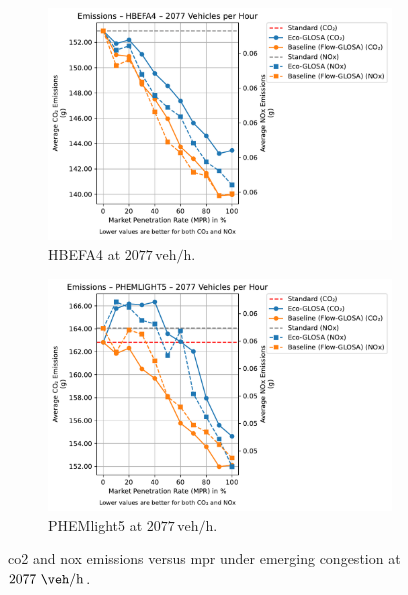 \begin{figure}[htbp]
  \centering
  \begin{subfigure}[b]{0.98\textwidth}
    \includegraphics[width=\textwidth]{data/img/Emissions/Emissions_HBEFA4_Cars2077.pdf}
    \caption{HBEFA4 at $2077\,\mathrm{veh/h}$.}
    \label{fig:Emis_2077_HBEFA4}
  \end{subfigure}
  \begin{subfigure}[b]{0.98\textwidth}
    \includegraphics[width=\textwidth]{data/img/Emissions/Emissions_PHEMLIGHT5_Cars2077.pdf}
    \caption{PHEMlight5 at $2077\,\mathrm{veh/h}$.}
    \label{fig:Emis_2077_PHEM}
  \end{subfigure}
  \caption[\ac{co2} and \ac{nox} emissions vs. \ac{mpr} at $2077~\unit{\veh\per\hour}$]{\ac{co2} and \ac{nox} emissions versus \ac{mpr} under emerging congestion at $2077~\unit{\veh\per\hour}$.}
  \label{fig:Emis_2077}
\end{figure}

